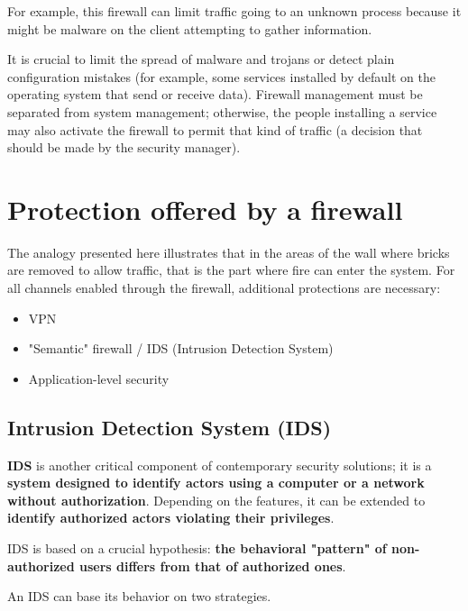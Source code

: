 For example, this firewall can limit traffic going to an unknown process because it might be malware on the client attempting to gather information.

It is crucial to limit the spread of malware and trojans or detect plain configuration mistakes (for example, some services installed by default on the operating system that send or receive data). Firewall management must be separated from system management; otherwise, the people installing a service may also activate the firewall to permit that kind of traffic (a decision that should be made by the security manager).



\section{Protection offered by a firewall}

The analogy presented here illustrates that in the areas of the wall where bricks are removed to allow traffic, that is the part where fire can enter the system. For all channels enabled through the firewall, additional protections are necessary:

\begin{itemize}
    \item VPN
    \item "Semantic" firewall / IDS (Intrusion Detection System)
    \item Application-level security
\end{itemize}


\subsection{Intrusion Detection System (IDS)}

\textbf{IDS} is another critical component of contemporary security solutions; it is a \textbf{system designed to identify actors using a computer or a network without authorization}.
Depending on the features, it can be extended to \textbf{identify authorized actors violating their privileges}.

IDS is based on a crucial hypothesis: \textbf{the behavioral "pattern" of non-authorized users differs from that of authorized ones}.

An IDS can base its behavior on two strategies.

